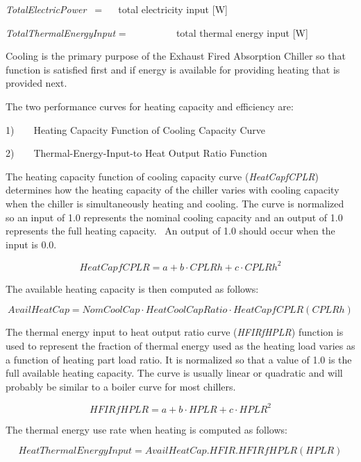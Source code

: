 \emph{TotalElectricPower~} = ~~ total electricity input {[}W{]}

\emph{TotalThermalEnergyInput} = ~~~~~~~~~ total thermal energy input {[}W{]}

Cooling is the primary purpose of the Exhaust Fired Absorption Chiller so that function is satisfied first and if energy is available for providing heating that is provided next.

The two performance curves for heating capacity and efficiency are:

1)~~~~Heating Capacity Function of Cooling Capacity Curve

2)~~~~Thermal-Energy-Input-to Heat Output Ratio Function

The heating capacity function of cooling capacity curve (\emph{HeatCapfCPLR}) determines how the heating capacity of the chiller varies with cooling capacity when the chiller is simultaneously heating and cooling. The curve is normalized so an input of 1.0 represents the nominal cooling capacity and an output of 1.0 represents the full heating capacity.~ An output of 1.0 should occur when the input is 0.0.

\begin{equation}
HeatCapfCPLR = a + b \cdot CPLRh + c \cdot CPLR{h^2}
\end{equation}

The available heating capacity is then computed as follows:

\begin{equation}
AvailHeatCap = NomCoolCap \cdot HeatCoolCapRatio \cdot HeatCapfCPLR(CPLRh)
\end{equation}

The thermal energy input to heat output ratio curve (\emph{HFIRfHPLR}) function is used to represent the fraction of thermal energy used as the heating load varies as a function of heating part load ratio. It is normalized so that a value of 1.0 is the full available heating capacity. The curve is usually linear or quadratic and will probably be similar to a boiler curve for most chillers.

\begin{equation}
HFIRfHPLR = a + b \cdot HPLR + c \cdot HPL{R^2}
\end{equation}

The thermal energy use rate when heating is computed as follows:

\begin{equation}
HeatThermalEnergyInput = AvailHeatCap.HFIR.HFIRfHPLR(HPLR)
\end{equation}

